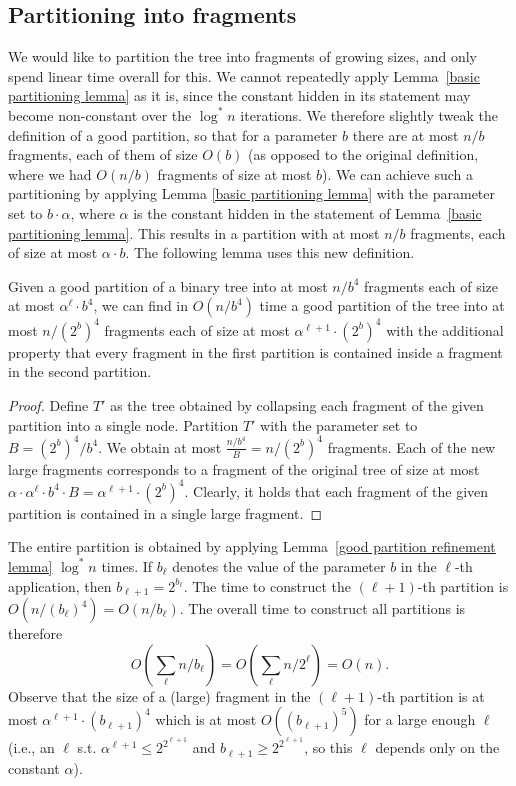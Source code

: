 \documentclass[a4paper,UKenglish]{lipics-v2016}
\theoremstyle{plain}
\begin{document}
\subsection{Partitioning into fragments}\label{section:partioioning}
We would like to partition the tree into fragments of growing sizes, and only spend linear time overall for this. We cannot repeatedly apply Lemma~\ref{basic partitioning lemma} as it is, since the constant hidden in its statement may become non-constant over the $\log^*n$ iterations. We therefore slightly tweak the definition of a good partition, so that for a parameter $b$ there are at most $n/b$ fragments, each of them of size $O(b)$ (as opposed to the original definition, where we had $O(n/b)$ fragments of size at most $b$). We can achieve such a partitioning by applying Lemma \ref{basic partitioning lemma} with the parameter set to $b \cdot \alpha$, where $\alpha$ is the constant hidden in the statement of Lemma~\ref{basic partitioning lemma}. This results in a partition with at most $n/b$ fragments, each of size at most $\alpha \cdot b$. The following lemma uses this new definition.

\begin{lemma}\label{good partition refinement lemma}
Given a good partition of a binary tree into at most $n/b^{4}$ fragments each of size at most $\alpha^{\ell}\cdot b^{4}$, 
we can find in $O(n/b^{4})$ time
a good partition of the tree into at most $n/(2^b)^{4}$ fragments each of size at most $\alpha^{\ell+1}\cdot (2^{b})^{4}$
with the additional property that every fragment in the first partition is contained inside a fragment in the second partition.
\end{lemma}
\begin{proof}
Define $T'$ as the tree obtained by collapsing each fragment of the given partition into a single node. Partition $T'$ with the parameter set to $B= {(2^{b})^{4}}/{b^{4}}$. We obtain at most $\frac{n/b^4}{B}=n/(2^{b})^{4}$ fragments. Each of the new large fragments corresponds to a fragment of the original tree of size at most $\alpha\cdot \alpha^{\ell}\cdot b^{4}\cdot B = \alpha^{\ell+1}\cdot (2^{b})^{4}$. Clearly, it holds that each fragment of the given partition is contained in a single large fragment.
\end{proof}

\noindent The entire partition is obtained by applying Lemma~\ref{good partition refinement lemma} $\log^{*}n$ times. 
If $b_{\ell}$ denotes the value of the parameter $b$ in the $\ell$-th application, then  $b_{\ell+1}=2^{b_{\ell}}$. The time to construct the $(\ell+1)$-th partition is $O(n/(b_{\ell})^{4})=O(n/b_{\ell})$. The overall time to construct all partitions is therefore 
$$ O(\sum_{\ell} {n}/{b_{\ell}}) = O(\sum_{\ell} {n}/{2^{\ell}}) = O(n).$$
Observe that the size of a (large) fragment in the $(\ell+1)$-th partition is at most $\alpha^{\ell+1} \cdot (b_{\ell+1})^{4}$ which is at most $O((b_{\ell+1})^5)$ for a large enough $\ell$ (i.e., an $\ell$ s.t. $\alpha^{\ell+1}\leq 2^{2^{\ell+1}}$ and $b_{\ell+1}\geq 2^{2^{\ell+1}}$, so
this $\ell$ depends only on the constant $\alpha$).
\end{document}
